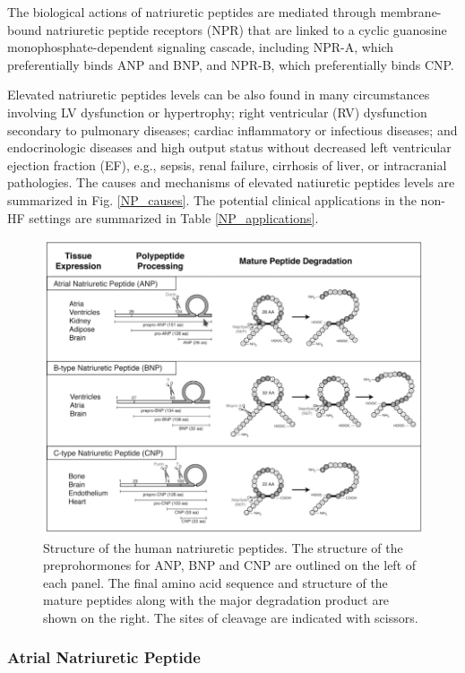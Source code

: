 \documentclass[14pt,a4paper,onecolumn]{extarticle}
\begin{document}
 The biological actions of natriuretic peptides are mediated through membrane-bound natriuretic peptide receptors (NPR) that are linked to a cyclic guanosine monophosphate-dependent signaling cascade, including NPR-A, which preferentially binds ANP and BNP, and NPR-B, which preferentially binds CNP.

Elevated natriuretic peptides levels can be also found in many circumstances involving LV dysfunction or hypertrophy; right ventricular (RV) dysfunction secondary to pulmonary diseases; cardiac inflammatory or infectious diseases; and endocrinologic diseases and high output status without decreased left ventricular ejection fraction (EF), e.g., sepsis, renal failure, cirrhosis of liver, or intracranial pathologies. The causes and mechanisms of elevated natiuretic peptides levels are summarized in Fig. \ref{NP_causes}. The potential clinical applications in the non-HF settings are summarized in Table \ref{NP_applications}.

\begin{figure}
    \centering
    \includegraphics[scale=0.4]{./images/NP_structure.png}
    \caption{Structure of the human natriuretic peptides. The structure of the preprohormones for ANP, BNP and CNP are outlined on the left of each panel. The final amino acid sequence and structure of the mature peptides along with the major degradation product are shown on the right. The sites of cleavage are indicated with scissors.}
    \label{NP_structure}
\end{figure}

\subsubsection{Atrial Natriuretic Peptide}
\end{document}
